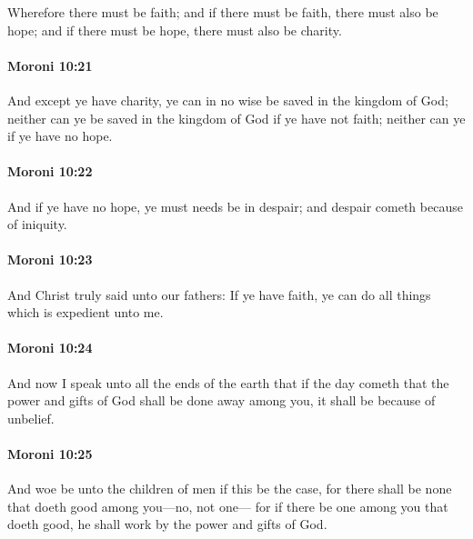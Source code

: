 			Wherefore there must be faith;
			and if there must be faith, there must also be hope;
			and if there must be hope, there must also be charity.

		\paragraph{Moroni 10:21} %
			\label{MORONI-10-21}

			And except ye have charity,
			ye can in no wise be saved in the kingdom of God;
			neither can ye be saved in the kingdom of God if ye have not faith;
			neither can ye if ye have no hope.

		\paragraph{Moroni 10:22} %
			\label{MORONI-10-22}

			And if ye have no hope, ye must needs be in despair;
			and despair cometh because of iniquity.

		\paragraph{Moroni 10:23} %
			\label{MORONI-10-23}

			And Christ truly said unto our fathers:
			If ye have faith, ye can do all things which is expedient unto me.

		\paragraph{Moroni 10:24} %
			\label{MORONI-10-24}

			And now I speak unto all the ends of the earth
			that if the day cometh
			that the power and gifts of God shall be done away among you,
			it shall be because of unbelief.

		\paragraph{Moroni 10:25} %
			\label{MORONI-10-25}

			And woe be unto the children of men if this be the case,
			for there shall be none that doeth good among you---no, not one---
			for if there be one among you that doeth good,
			he shall work by the power and gifts of God.

